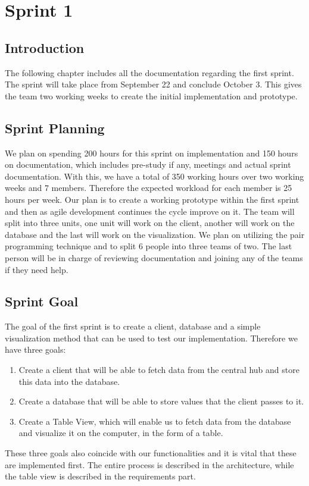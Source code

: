 \documentclass[../document.tex]{subfiles}
\begin{document}
\section{Sprint 1}

\subsection{Introduction}
The following chapter includes all the documentation regarding the first sprint. The sprint will take place from September 22 and conclude October 3. This gives the team two working weeks to create the initial implementation and prototype.

\subsection{Sprint Planning}
We plan on spending 200 hours for this sprint on implementation and 150 hours on documentation, which includes pre-study if any, meetings and actual sprint documentation. With this, we have a total of 350 working hours over two working weeks and 7 members. Therefore the expected workload for each member is 25 hours per week. Our plan is to create a working prototype within the first sprint and then as agile development continues the cycle improve on it. The team will split into three units, one unit will work on the client, another will work on the database and the last will work on the visualization. We plan on utilizing the pair programming technique and to split 6 people into three teams of two. The last person will be in charge of reviewing documentation and joining any of the teams if they need help.

\subsection{Sprint Goal}
The goal of the first sprint is to create a client, database and a simple visualization method that can be used to test our implementation. Therefore we have three goals:
\begin{enumerate}
\item
Create a client that will be able to fetch data from the central hub and store this data into the database.
\item
Create a database that will be able to store values that the client passes to it.
\item
Create a Table View, which will enable us to fetch data from the database and visualize it on the computer, in the form of a table.
\end{enumerate}
These three goals also coincide with our functionalities and it is vital that these are implemented first. The entire process is described in the architecture, while the table view is described in the requirements part.
\end{document}
